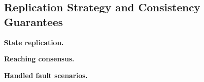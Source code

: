 \subsection{Replication Strategy and Consistency Guarantees}
\label{sub:approach_replication_strategy}

\textbf{State replication.}

\noindent\textbf{Reaching consensus.}

\noindent\textbf{Handled fault scenarios.}